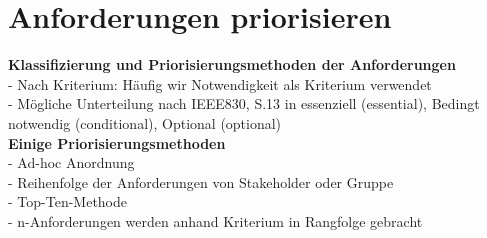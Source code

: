 \section{Anforderungen priorisieren}

\textbf{Klassifizierung und Priorisierungsmethoden der Anforderungen} \\
-  Nach Kriterium: Häufig wir Notwendigkeit als Kriterium verwendet \\
- Mögliche Unterteilung nach IEEE830, S.13 in essenziell (essential), Bedingt notwendig (conditional), Optional (optional) \\

\textbf{Einige Priorisierungsmethoden} \\
- Ad-hoc Anordnung \\
- Reihenfolge der Anforderungen von Stakeholder oder Gruppe \\
- Top-Ten-Methode \\
- n-Anforderungen werden anhand Kriterium in Rangfolge gebracht
\newpage
